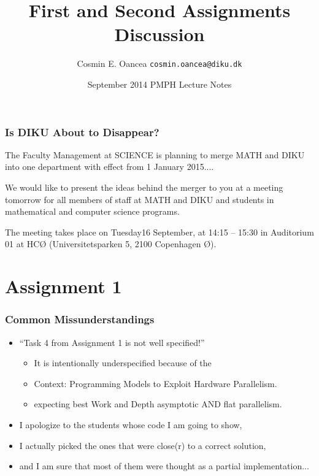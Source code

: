 \documentclass{beamer}
\title[Assignments]{First and Second Assignments Discussion}
\author[C.~Oancea]{Cosmin E. Oancea {\tt cosmin.oancea@diku.dk}}
\institute{Department of Computer Science (DIKU)\\University of Copenhagen}
\date[Sept 2014]{September 2014 PMPH Lecture Notes}
\newcommand{\emp}[1]{\textcolor{DikuRed}{ #1}}
\begin{document}
\titleslide

\begin{frame}[fragile,t]
\frametitle{Is DIKU About to Disappear?}

The Faculty Management at SCIENCE is planning to merge MATH and DIKU 
into one department with effect from 1 January 2015....\bigskip

We would like to present the ideas behind the merger to you at a 
meeting tomorrow for all members of staff at MATH and DIKU and 
students in mathematical and computer science programs.\bigskip


The meeting takes place on Tuesday16 September, at 14:15 – 15:30 
in Auditorium 01 at HCØ (Universitetsparken 5, 2100 Copenhagen Ø).

\end{frame}

\section{Assignment 1}

\begin{frame}[fragile]
	\tableofcontents[currentsection]
\end{frame}


\begin{frame}[fragile,t]
\frametitle{Common Missunderstandings}

\begin{itemize}
    \item ``Task 4 from Assignment 1 is not well specified!''\\\pause
        \begin{itemize}
            \item It is intentionally underspecified because of the
            \item Context: Programming Models to Exploit Hardware Parallelism. 
            \item expecting \emp{best Work and Depth asymptotic AND flat parallelism.}  
        \end  {itemize}\medskip
    \item I apologize to the students whose code I am going to show,
    \item I actually picked the ones that were close(r) to a correct solution,
    \item and I am sure that most of them were thought as a partial implementation...


\end  {itemize}
\end{frame}
\end{document}
